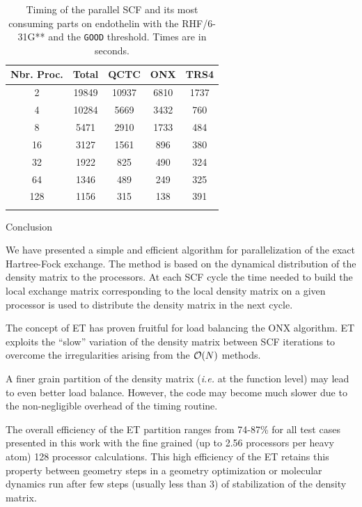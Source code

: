 \documentclass[prl,preprint,doublespace]{revtex4} %
\newcommand{\commentoutA}[1]{}
\begin{document}
{\begin{table}[t]
  \centering
  \caption{\protect
    Timing of the parallel SCF and its most consuming parts
    on endothelin with the RHF/6-31G** and the {\tt GOOD} threshold.
    Times are in seconds.
  }\label{Tab:EndothelinTotalTiming}
  \begin{tabular}{ccccc}
    \toprule
    Nbr. Proc. & Total & QCTC & ONX & TRS4 \\
  \hline
    2 & 19849 & 10937 & 6810 & 1737 \\
    4 & 10284 &  5669 & 3432 &  760 \\
    8 &  5471 &  2910 & 1733 &  484 \\
   16 &  3127 &  1561 &  896 &  380 \\
   32 &  1922 &   825 &  490 &  324 \\
   64 &  1346 &   489 &  249 &  325 \\
  128 &  1156 &   315 &  138 &  391 \\
  \botrule
  \end{tabular}
\end{table}

}\commentoutA

\section{Conclusion}\label{Sec:Conc}

 We have presented a simple and efficient algorithm for 
 parallelization of the exact Hartree-Fock
 exchange. The method is based on the dynamical distribution 
 of the density matrix to the processors. At each SCF cycle the
 time needed to build the local exchange matrix corresponding
 to the local density matrix on a given processor is used to
 distribute the density matrix in the next cycle. 

 The concept of ET has proven fruitful for load balancing the ONX 
 algorithm. ET exploits the ``slow'' variation of the density matrix 
 between SCF iterations to overcome the irregularities arising 
 from the ${\cal O}(N)$ methods.

 A finer grain partition of the density matrix ({\em i.e.} at the function level)
 may lead to even better load balance. However, the code 
 may become much slower due to the non-negligible overhead 
 of the timing routine.

 The overall efficiency of the ET partition ranges from 74-87\%
 for all test cases presented in this work with the fine grained
 (up to 2.56 processors per heavy atom) 128 processor calculations.
 This high efficiency of the ET retains this property between geometry steps
 in a geometry optimization or molecular dynamics run after
 few steps (usually less than 3) of stabilization of the density matrix.
\end{document}
